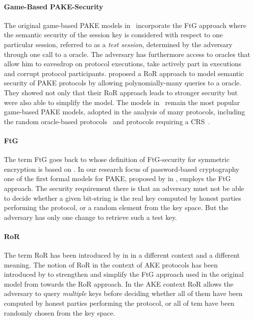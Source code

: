 \paragraph{Game-Based \ac{PAKE}-Security}
The original game-based \ac{PAKE} models in~\cite{Bellare2000,Boyko2000} incorporate the \ac{FtG} approach where the semantic security of the session key is considered with respect to one particular session, referred to as a \emph{test session}, determined by the adversary through one call to a \Test oracle.
The adversary has furthermore access to oracles that allow him to eavesdrop on protocol executions, take actively part in executions and corrupt protocol participants.
\citeauthor{Abdalla2005} \cite{Abdalla2005} proposed a \ac{RoR} approach to model semantic security of PAKE protocols by allowing polynomially-many queries to a \Test oracle.
They showed not only that their \ac{RoR} approach leads to stronger security but were also able to simplify the model.
The models in~\cite{Bellare2000,Abdalla2005} remain the most popular game-based PAKE models, adopted in the analysis of many protocols, including the random oracle-based protocols~\cite{Abdalla2006,Abdalla2005b} and protocols requiring a \ac{CRS}~\cite{KatzOY01,Gennaro2003,Gennaro2008,Katz2009a}.


\paragraph{\acl{FtG}}
The term \acl{FtG} goes back to \citeauthor{Bellare97} \cite{Bellare97} whose definition of \ac{FtG}-security for symmetric encryption is based on \cite{Goldwasser84} \cite{Micali86}.
In our research focus of password-based cryptography one of the first formal models for \ac{PAKE}, proposed by \citeauthor{Bellare2000} in \cite{Bellare2000}, employs the \ac{FtG} approach.
The security requirement there is that an adversary must not be able to decide whether a given bit-string is the real key computed by honest parties performing the protocol, or a random element from the key space.
But the adversary has only one change to retrieve such a test key.

\paragraph{\acl{RoR}}
The term \acl{RoR} has been introduced by \citeauthor{Bellare97} in \cite{Bellare97} in a different context and a different meaning.
The notion of \ac{RoR} in the context of \acl{AKE} protocols has been introduced by \citeauthor{Abdalla2005} to strengthen and simplify the \ac{FtG} approach used in the original model from \cite{Bellare2000} towards the \ac{RoR} approach.
In the \ac{AKE} context \ac{RoR} allows the adversary to query \emph{multiple} keys before deciding whether all of them have been computed by honest parties performing the protocol, or all of tem  have been randomly chosen from the key space.

